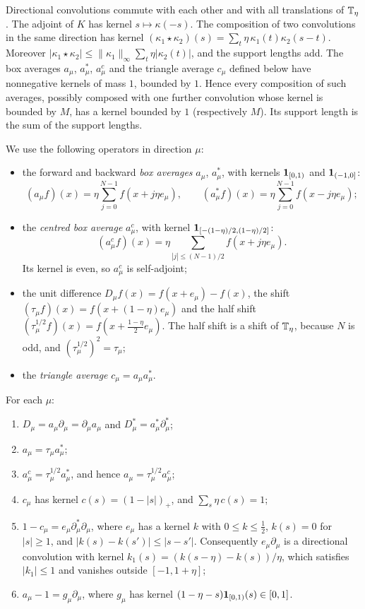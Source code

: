 Directional convolutions commute with each other and with all translations of $\mathbb T_\eta$. The adjoint of $K$ has kernel $s\mapsto\kappa(-s)$. The composition of two convolutions in the same direction has kernel $(\kappa_1\star\kappa_2)(s)=\sum_t\eta\,\kappa_1(t)\kappa_2(s-t)$. Moreover $|\kappa_1\star\kappa_2|\le\|\kappa_1\|_\infty\sum_t\eta|\kappa_2(t)|$, and the support lengths add. The box averages $a_\mu$, $a^*_\mu$, $a^c_\mu$ and the triangle average $c_\mu$ defined below have nonnegative kernels of mass $1$, bounded by $1$. Hence every composition of such averages, possibly composed with one further convolution whose kernel is bounded by $M$, has a kernel bounded by $1$ (respectively $M$). Its support length is the sum of the support lengths.

We use the following operators in direction $\mu$:
\begin{itemize}
\item the forward and backward \emph{box averages} $a_\mu$, $a_\mu^*$, with kernels $\mathbf 1_{[0,1)}$ and $\mathbf 1_{(-1,0]}$:
\[
(a_\mu f)(x)=\eta\sum_{j=0}^{N-1}f(x+j\eta e_\mu),\qquad (a_\mu^*f)(x)=\eta\sum_{j=0}^{N-1}f(x-j\eta e_\mu);
\]
\item the \emph{centred box average} $a^c_\mu$, with kernel $\mathbf 1_{[-(1-\eta)/2,(1-\eta)/2]}$:
\[
(a^c_\mu f)(x)=\eta\sum_{|j|\le(N-1)/2}f(x+j\eta e_\mu).
\]
Its kernel is even, so $a^c_\mu$ is self-adjoint;
\item the unit difference $D_\mu f(x)=f(x+e_\mu)-f(x)$, the shift $(\tau_\mu f)(x)=f(x+(1-\eta)e_\mu)$ and the half shift $(\tau^{1/2}_\mu f)(x)=f(x+\frac{1-\eta}2e_\mu)$. The half shift is a shift of $\mathbb T_\eta$, because $N$ is odd, and $(\tau^{1/2}_\mu)^2=\tau_\mu$;
\item the \emph{triangle average} $c_\mu=a_\mu a_\mu^*$.
\end{itemize}

\begin{lemma}\label{lem:1d}
For each $\mu$:
\begin{enumerate}[label=(\alph*)]
\item $D_\mu=a_\mu\partial_\mu=\partial_\mu a_\mu$ and $D_\mu^*=a_\mu^*\partial_\mu^*$;
\item $a_\mu=\tau_\mu a_\mu^*$;
\item[(b$'$)] $a^c_\mu=\tau^{1/2}_\mu a^*_\mu$, and hence $a_\mu=\tau^{1/2}_\mu a^c_\mu$;
\item $c_\mu$ has kernel $c(s)=(1-|s|)_+$, and $\sum_s\eta\,c(s)=1$;
\item $1-c_\mu=e_\mu\partial_\mu^*\partial_\mu$, where $e_\mu$ has a kernel $k$ with $0\le k\le\frac12$, $k(s)=0$ for $|s|\ge1$, and $|k(s)-k(s')|\le|s-s'|$. Consequently $e_\mu\partial_\mu$ is a directional convolution with kernel $k_1(s)=(k(s-\eta)-k(s))/\eta$, which satisfies $|k_1|\le1$ and vanishes outside $[-1,1+\eta]$;
\item $a_\mu-1=g_\mu\partial_\mu$, where $g_\mu$ has kernel $(1-\eta-s)\mathbf 1_{[0,1)}(s)\in[0,1]$.
\end{enumerate}
\end{lemma}

